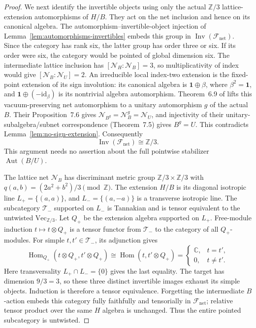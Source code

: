 \documentclass[11pt,a4paper]{article}
\theoremstyle{definition}
\renewcommand{\Vec}{\mathrm{Vec}}
\begin{document}
\begin{proof}
We next identify the invertible objects using only the actual
$\mathbb Z/3$ lattice-extension automorphisms of $H/B$.  They act
on the net inclusion and hence on its canonical algebra.  The
automorphism--invertible-object injection of
Lemma~\ref{lem:automorphisms-invertibles} embeds this group in
$\operatorname{Inv}(\mathcal F_{\mathrm{net}})$.  Since the category
has rank six, the latter group has order three or six.  If its order
were six, the category would be pointed of global dimension six.
The intermediate lattice inclusion has $[\mathcal N_H:\mathcal N_B]=3$,
so multiplicativity of index would give
$[\mathcal N_B:\mathcal N_U]=2$.  An irreducible local index-two
extension is the fixed-point extension of its sign involution: its
canonical algebra is $\mathbf1\oplus\beta$, where $\beta^2=\mathbf1$,
and $\mathbf1\oplus(-\mathrm{id}_\beta)$ is its nontrivial algebra
automorphism.  Theorem~6.9 of \cite{CKLW} lifts this vacuum-preserving
net automorphism to a unitary automorphism $g$ of the actual $B$.
Their Proposition~7.6 gives
$\mathcal N_{B^g}=\mathcal N_B^g=\mathcal N_U$, and injectivity of
their unitary-subalgebra/subnet correspondence (Theorem~7.5) gives
$B^g=U$.  This contradicts
Lemma~\ref{lem:no-sign-extension}.  Consequently
\[
 \operatorname{Inv}(\mathcal F_{\mathrm{net}})\cong\mathbb Z/3.
\]
This argument needs no assertion about the full pointwise stabilizer
$\operatorname{Aut}(B/U)$.

The lattice net $\mathcal N_B$ has discriminant metric group
$\mathbb Z/3\times\mathbb Z/3$ with
$q(a,b)=(2a^2+b^2)/3\pmod{\mathbb Z}$.  The extension $H/B$ is its
diagonal isotropic line $L_+=\{(a,a)\}$, and
$L_-=\{(a,-a)\}$ is a transverse isotropic line.  The subcategory
$\mathcal T_-$ supported on $L_-$ is Tannakian and is tensor
equivalent to the untwisted $\Vec_{\mathbb Z/3}$.  Let $Q_+$ be the
extension algebra supported on $L_+$.  Free-module induction
$t\mapsto t\otimes Q_+$ is a tensor functor from $\mathcal T_-$ to
the category of all $Q_+$-modules.  For simple $t,t'\in\mathcal T_-$,
its adjunction gives
\[
 \operatorname{Hom}_{Q_+}(t\otimes Q_+,t'\otimes Q_+)
 \cong\operatorname{Hom}(t,t'\otimes Q_+)
 =\begin{cases}\mathbb C,&t=t',\\0,&t\ne t'.\end{cases}
\]
Here transversality $L_+\cap L_-=\{0\}$ gives the last equality.
The target has dimension $9/3=3$, so these three distinct invertible
images exhaust its simple objects.  Induction is therefore a tensor
equivalence.  Forgetting the intermediate $B$-action embeds this
category fully faithfully and tensorially in
$\mathcal F_{\mathrm{net}}$; relative tensor product over the same
$H$ algebra is unchanged.  Thus the entire pointed subcategory is
untwisted.


\end{proof}
\end{document}

